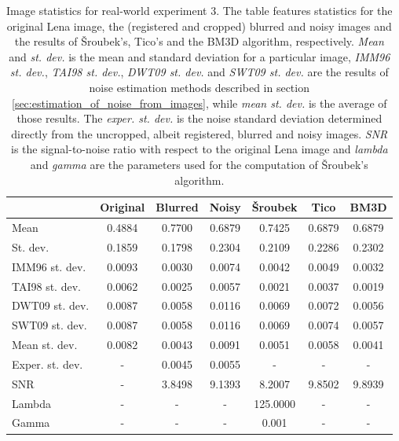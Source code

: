 \documentclass[12pt,notitlepage]{report}
\begin{document}
\clearpage 
\begin{table}[htb]
	\centering
	\begin{tabular}{ | l | c | c | c | c | c | c | }
	\hline
		           & Original & Blurred & Noisy  & Šroubek & Tico   & BM3D   \\ \hline 
	Mean           & 0.4884   & 0.7700  & 0.6879 & 0.7425  & 0.6879 & 0.6879 \\ \hline 
	St. dev.       & 0.1859   & 0.1798  & 0.2304 & 0.2109  & 0.2286 & 0.2302 \\ \hline 
	IMM96 st. dev. & 0.0093   & 0.0030  & 0.0074 & 0.0042  & 0.0049 & 0.0032 \\ \hline 
	TAI98 st. dev. & 0.0062   & 0.0025  & 0.0057 & 0.0021  & 0.0037 & 0.0019 \\ \hline 
	DWT09 st. dev. & 0.0087   & 0.0058  & 0.0116 & 0.0069  & 0.0072 & 0.0056 \\ \hline 
	SWT09 st. dev. & 0.0087   & 0.0058  & 0.0116 & 0.0069  & 0.0074 & 0.0057 \\ \hline 
	Mean st. dev.  & 0.0082   & 0.0043  & 0.0091 & 0.0051  & 0.0058 & 0.0041 \\ \hline 
	Exper. st. dev.& -        & 0.0045  & 0.0055 & -       & -      & -      \\ \hline 
	SNR            & -        & 3.8498  & 9.1393 & 8.2007  & 9.8502 & 9.8939 \\ \hline 
	Lambda         & -        & -       & -      & 125.0000& -      & -      \\ \hline 
	Gamma          & -        & -       & -      & 0.001   & -      & -      \\ \hline 

	\end{tabular}
	\caption[Image statistics for real-world experiment 3]{Image statistics for real-world experiment 3. The table features statistics for the original Lena image, the (registered and cropped) blurred and noisy images and the results of Šroubek's, Tico's and the BM3D algorithm, respectively. {\em Mean} and {\em st. dev.} is the mean and standard deviation for a particular image, {\em IMM96 st. dev.}, {\em TAI98 st. dev.}, {\em DWT09 st. dev.} and {\em SWT09 st. dev.} are the results of noise estimation methods described in section \ref{sec:estimation_of_noise_from_images}, while {\em mean st. dev.} is the average of those results. The {\em exper. st. dev.} is the noise standard deviation determined directly from the uncropped, albeit registered, blurred and noisy images. {\em SNR} is the signal-to-noise ratio with respect to the original Lena image and {\em lambda} and {\em gamma} are the parameters used for the computation of Šroubek's algorithm.}
	\label{tab:experiment_003_statistics}
\end{table}
\end{document}
